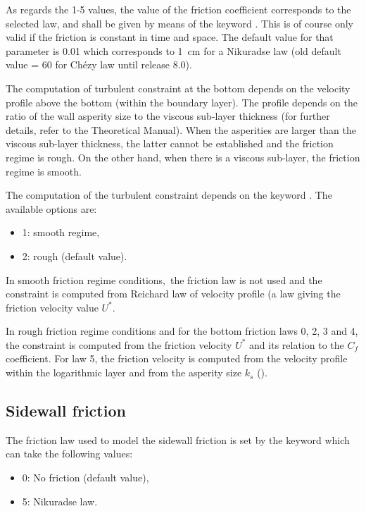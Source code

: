 As regards the 1-5 values, the value of the friction coefficient corresponds to
the selected law, and shall be given by means of the keyword .
This is of course only valid if the friction is constant in time and space.
The default value for that parameter is 0.01
which corresponds to 1~cm for a Nikuradse law (old default value = 60 for Chézy
law until release 8.0).

The computation of turbulent constraint at the bottom depends on the velocity
profile above the bottom (within the boundary layer). The profile depends on
the ratio of the wall asperity size to the viscous sub-layer thickness (for
further details, refer to the Theoretical Manual). When the asperities are
larger than the viscous sub-layer thickness, the latter cannot be established
and the friction regime is rough. On the other hand, when there is a viscous
sub-layer, the friction regime is smooth.

The computation of the turbulent constraint depends on the keyword
. The available options are:

\begin{itemize}
\item  1: smooth regime,

\item  2: rough (default value).
\end{itemize}

In smooth friction regime conditions,~the friction law is not used and the
constraint is computed from Reichard law of velocity profile (a law giving the
friction velocity value $U^{*}$.

In rough friction regime conditions and for the bottom friction laws 0, 2, 3
and 4, the constraint is computed from the friction velocity $U^{*}$ and its
relation to the $C_{f}$ coefficient. For law 5, the friction velocity is
computed from the velocity profile within the logarithmic layer and from the
asperity size $k_{s}$ ().


\subsection{Sidewall friction}

The friction law used to model the sidewall friction is set by the keyword
 which can take the following
values:

\begin{itemize}
\item  0: No friction (default value),

\item  5: Nikuradse law.
\end{itemize}

